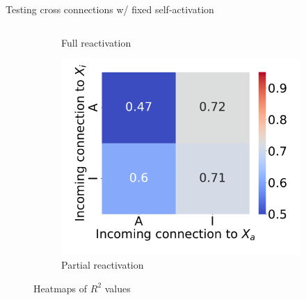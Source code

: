 \documentclass[aspectratio=169,9pt]{beamer}
\begin{document}
\begin{frame}{Testing cross connections w/ fixed self-activation}
\begin{columns}
\begin{column}{0.62\textwidth}
\begin{figure}[h]
\begin{subfigure}[b]{0.49\textwidth}
                            \caption{Full reactivation}
                        \end{subfigure}
                        \pause
                        \begin{subfigure}[b]{0.49\textwidth}
                            \centering
                            \includegraphics[width=\textwidth]{vary_cross-AA-Partial_timeshifted-rsq-hmap}
                            \caption{Partial reactivation}
                        \end{subfigure}
                    \pause[2]\caption{Heatmaps of $R^2$ values}
                \end{figure}
            \end{column}
        \end{columns}
    \end{frame}
\end{document}
